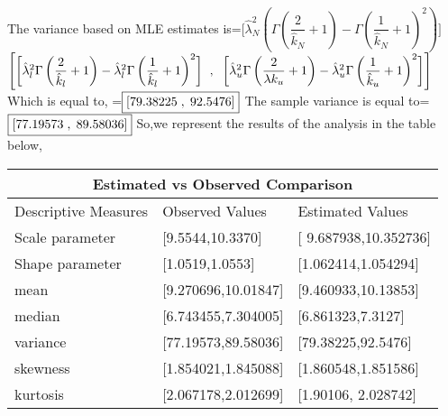 \documentclass[12pt,a4paper,oneside]{article}
\begin{document}
The variance based on MLE estimates is=$\Biggl[{\hat{\lambda}_{N}^{2}}\left(\Gamma\left(\dfrac{2}{\hat{k}_{N}}+1\right)-\Gamma\left(\dfrac{1}{\hat{k}_{N}}+1\right)^{2}\right)\Biggr]$\newline\newline
\hspace*{2cm}$\Biggl[\biggl[{\hat{\lambda}_{l}^{2}}\Gamma\left(\dfrac{2}{\hat{k}_{l}}+1\right)-{\hat{\lambda}_{l}^{2}}\Gamma\left(\dfrac{1}{\hat{k}_{l}}+1\right)^{2}\biggr]\hspace{2mm},\hspace{2mm}\biggl[{\hat{\lambda}_{u}^{2}}\Gamma\left(\dfrac{2}{\lambda{k}_{u}}+1\right)-{\hat{\lambda}_{u}^{2}}\Gamma\left(\dfrac{1}{\hat{k}_{u}}+1\right)^{2}\biggr]\Biggr]$\newline\newline
Which is equal to,\newline\newline
\hspace*{5cm}=$\boxed{[79.38225\hspace{1mm},\hspace{1mm}92.5476]}$\newline\newline
The sample variance is equal to=$\boxed{[77.19573\hspace{1mm},\hspace{1mm}89.58036]}$\newline\newline
So,we represent the results of the analysis in the table below,\newline\newline
\begin{tabular}{ |p{5cm}|p{5cm}|p{5cm}|  }
\hline
\multicolumn{3}{|c|}{Estimated vs Observed Comparison} \\
\hline
Descriptive Measures & Observed Values & Estimated Values \\
\hline
Scale parameter & [9.5544,10.3370] & [ 9.687938,10.352736] \\
\hline
Shape parameter & [1.0519,1.0553] & [1.062414,1.054294] \\
\hline
mean& [9.270696,10.01847]  & [9.460933,10.13853] \\
\hline
median &[6.743455,7.304005] &[6.861323,7.3127]\\
\hline
variance   & [77.19573,89.58036] & [79.38225,92.5476] \\
\hline
skewness   & [1.854021,1.845088]&[1.860548,1.851586]\\
\hline
kurtosis   & [2.067178,2.012699] &[1.90106, 2.028742]\\
\hline
\end{tabular}
\end{document}
